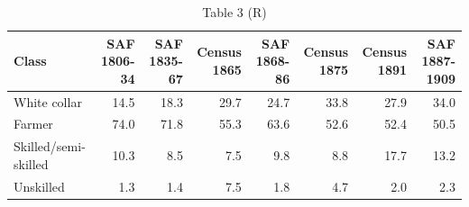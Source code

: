 \begin{table}

\caption{Table 3 (R)}
\centering
\begin{tabular}[t]{lrrrrrrr}
\toprule
Class & SAF 1806-34 & SAF 1835-67 & Census 1865 & SAF 1868-86 & Census 1875 & Census 1891 & SAF 1887-1909\\
\midrule
White collar & 14.5 & 18.3 & 29.7 & 24.7 & 33.8 & 27.9 & 34.0\\
Farmer & 74.0 & 71.8 & 55.3 & 63.6 & 52.6 & 52.4 & 50.5\\
Skilled/semi-skilled & 10.3 & 8.5 & 7.5 & 9.8 & 8.8 & 17.7 & 13.2\\
Unskilled & 1.3 & 1.4 & 7.5 & 1.8 & 4.7 & 2.0 & 2.3\\
\bottomrule
\end{tabular}
\end{table}

